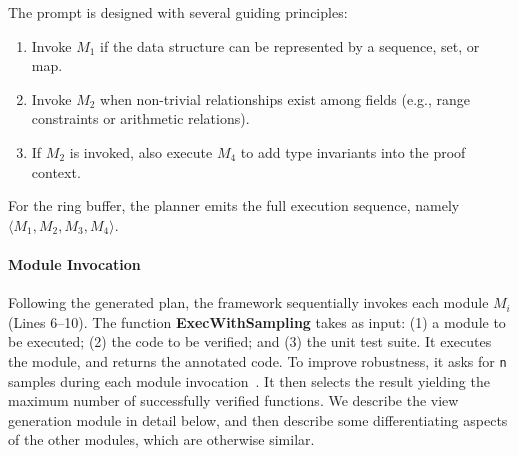 The prompt is designed with several guiding principles:
\begin{enumerate}
    \item Invoke $M_1$ if the data structure can be represented by a sequence, set, or map.
    \item Invoke $M_2$ when non-trivial relationships exist among fields (e.g., range constraints or arithmetic relations).
    \item If $M_2$ is invoked, also execute $M_4$ to add type invariants into the proof context.
\end{enumerate}



\noindent
For the ring buffer, the planner emits the full execution sequence, namely $\langle M_1, M_2, M_3, M_4\rangle$. 


\paragraph{Module Invocation} Following the generated plan, the framework sequentially invokes each module $M_i$ (Lines 6–10). The function \textbf{ExecWithSampling} takes as input: (1) a module to be executed; (2) the code to be verified; and (3) the unit test suite.  It executes the module, and returns the annotated code. To improve robustness, it asks for \texttt{n} samples during each module invocation~\cite{sampling}. It then selects the result yielding the maximum number of successfully verified functions.  We describe the view generation module in detail below, and then describe some differentiating aspects of the other modules, which are otherwise similar.

